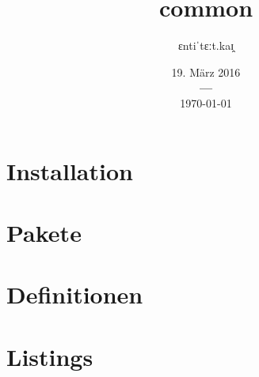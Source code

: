 \documentclass[a4paper,12pt]{article}
\title{\fontspec{Times New Roman}common}
\title{\fontspec{Times New Roman}\common}
\author{\fontspec{Times New Roman}ɛntiˈtɛːt.kaɪ̯}
\date{%
			{\fontspec{Times New Roman}19. März 2016} \\
			{\bf---} \\[0.2\baselineskip]
			\fontspec{Times New Roman}\today}
\begin{document}
		\listoftodos

		


		\maketitle



		

		\tableofcontents  %
		\tableofcontents    %
		\listoffigures      %
		\listoftables       %
		\lstlistoflistings  %



		\chapter{Installation}
		\chapter{Pakete}
		\chapter{Definitionen}



		\printindex


		\appendix
		\chapter{Listings}


		
\end{document}
